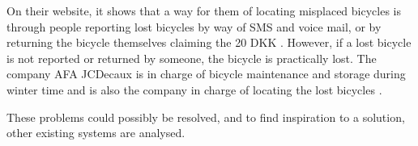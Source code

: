 On their website, it shows that a way for them of locating misplaced bicycles is through people reporting lost bicycles by way of SMS and voice mail, or by returning the bicycle themselves claiming the 20 DKK \citep{misc:aalborgbycykelmangler}.
However, if a lost bicycle is not reported or returned by someone, the bicycle is practically lost.
The company AFA JCDecaux is in charge of bicycle maintenance and storage during winter time and is also the company in charge of locating the lost bicycles \citep{misc:aalborgcykling}.

These problems could possibly be resolved, and to find inspiration to a solution, other existing systems are analysed.